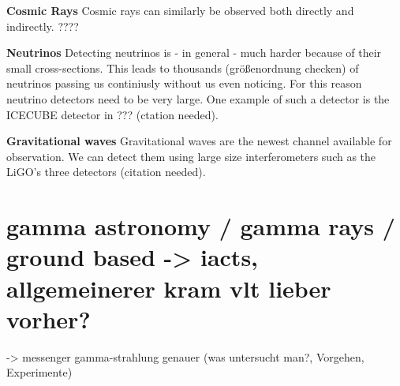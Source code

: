 \textbf{Cosmic Rays}
Cosmic rays can similarly be observed both directly and indirectly.
????

\textbf{Neutrinos}
Detecting neutrinos is - in general - much harder because of
their small cross-sections. This leads to thousands (größenordnung checken) of
neutrinos passing us continiusly without us even noticing.
For this reason neutrino detectors need to be very large. One example
of such a detector is the ICECUBE detector in ??? (ctation needed).

\textbf{Gravitational waves}
Gravitational waves are the newest channel available for observation.
We can detect them using large size interferometers such as
the LiGO's three detectors (citation needed).





\section{gamma astronomy / gamma rays / ground based -> iacts, allgemeinerer kram vlt lieber vorher?}
-> messenger gamma-strahlung genauer (was untersucht man?, Vorgehen, Experimente)
